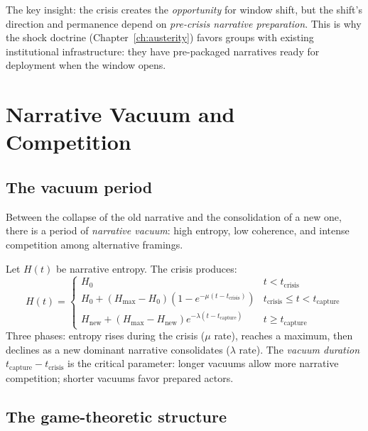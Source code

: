 The key insight: the crisis creates the \emph{opportunity} for window shift, but the shift's direction and permanence depend on \emph{pre-crisis narrative preparation}.
This is why the shock doctrine (Chapter~\ref{ch:austerity}) favors groups with existing institutional infrastructure: they have pre-packaged narratives ready for deployment when the window opens.

\section{Narrative Vacuum and Competition}
\label{sec:ch29-vacuum}

\subsection{The vacuum period}

Between the collapse of the old narrative and the consolidation of a new one, there is a period of \emph{narrative vacuum}: high entropy, low coherence, and intense competition among alternative framings.

\begin{model}
\label{mod:vacuum}
Let $H(t)$ be narrative entropy.
The crisis produces:
\[
  H(t) = \begin{cases}
    H_0 & t < t_{\text{crisis}} \\
    H_0 + (H_{\max} - H_0)(1 - e^{-\mu(t - t_{\text{crisis}})}) & t_{\text{crisis}} \leq t < t_{\text{capture}} \\
    H_{\text{new}} + (H_{\max} - H_{\text{new}}) e^{-\lambda(t - t_{\text{capture}})} & t \geq t_{\text{capture}}
  \end{cases}
\]
Three phases: entropy rises during the crisis ($\mu$ rate), reaches a maximum, then declines as a new dominant narrative consolidates ($\lambda$ rate).
The \emph{vacuum duration} $t_{\text{capture}} - t_{\text{crisis}}$ is the critical parameter: longer vacuums allow more narrative competition; shorter vacuums favor prepared actors.
\end{model}

\subsection{The game-theoretic structure}

